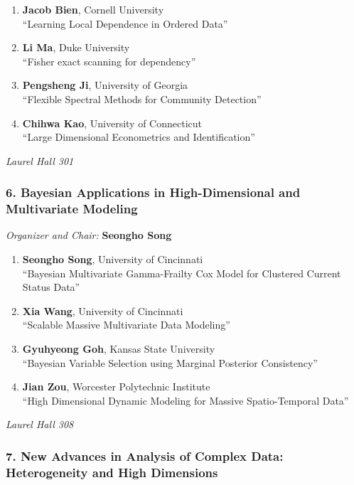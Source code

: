 \begin{enumerate}
\item \textbf{Jacob Bien}, Cornell University \\
``Learning Local Dependence in Ordered Data''
\item \textbf{Li Ma}, Duke University \\
``Fisher exact scanning for dependency''
\item \textbf{Pengsheng Ji}, University of Georgia \\
``Flexible Spectral Methods for Community Detection''
\item \textbf{Chihwa Kao}, University of Connecticut \\
``Large Dimensional Econometrics and Identification''
\end{enumerate}

\emph{Laurel Hall 301} \\[.5em]

\subsubsection*{6. Bayesian Applications in High-Dimensional and Multivariate Modeling}

\emph{Organizer and Chair:} \textbf{Seongho Song}

\begin{enumerate}
\item \textbf{Seongho Song}, University of Cincinnati \\
``Bayesian Multivariate Gamma-Frailty Cox Model for Clustered Current Status Data''
\item \textbf{Xia Wang}, University of Cincinnati \\
``Scalable Massive Multivariate Data Modeling''
\item \textbf{Gyuhyeong Goh}, Kansas State University \\
``Bayesian Variable Selection using Marginal Posterior Consistency''
\item \textbf{Jian Zou}, Worcester Polytechnic Institute \\
``High Dimensional Dynamic Modeling for Massive Spatio-Temporal Data''
\end{enumerate}

\emph{Laurel Hall 308} \\[.5em]

\subsubsection*{7. New Advances in Analysis of Complex Data: Heterogeneity and High Dimensions}

